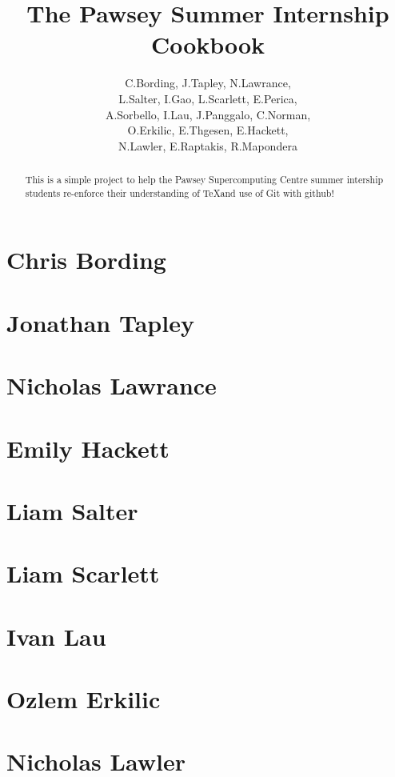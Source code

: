 \documentclass[11pt,a4paper]{report}
\title{The Pawsey Summer Internship Cookbook}
\author{C.Bording, J.Tapley, N.Lawrance,\\
L.Salter, I.Gao, L.Scarlett, E.Perica,\\
A.Sorbello, I.Lau, J.Panggalo, C.Norman,\\
O.Erkilic, E.Thgesen, E.Hackett,\\
N.Lawler, E.Raptakis, R.Mapondera}
\begin{document}
\maketitle
\tableofcontents


\begin{abstract}

This is a simple project to help the Pawsey Supercomputing Centre summer intership students re-enforce their understanding of \TeX and use of Git with github!

\end{abstract}

\chapter{Chris Bording}



\chapter{Jonathan Tapley}


\chapter{Nicholas Lawrance}


\chapter{Emily Hackett}


\chapter{Liam Salter}


\chapter{Liam Scarlett}


\chapter{Ivan Lau}


\chapter{Ozlem Erkilic}


\chapter{Nicholas Lawler}

\end{document}
